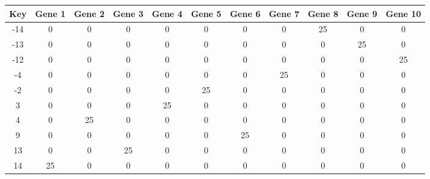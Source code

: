 \begin{tabular}{|c|c|c|c|c|c|c|c|c|c|c|}
\hline
Key & Gene 1 & Gene 2 & Gene 3 & Gene 4 & Gene 5 & Gene 6 & Gene 7 & Gene 8 & Gene 9 & Gene 10 \\
\hline
-14 & 0 & 0 & 0 & 0 & 0 & 0 & 0 & 25 & 0 & 0 \\
-13 & 0 & 0 & 0 & 0 & 0 & 0 & 0 & 0 & 25 & 0 \\
-12 & 0 & 0 & 0 & 0 & 0 & 0 & 0 & 0 & 0 & 25 \\
-4 & 0 & 0 & 0 & 0 & 0 & 0 & 25 & 0 & 0 & 0 \\
-2 & 0 & 0 & 0 & 0 & 25 & 0 & 0 & 0 & 0 & 0 \\
3 & 0 & 0 & 0 & 25 & 0 & 0 & 0 & 0 & 0 & 0 \\
4 & 0 & 25 & 0 & 0 & 0 & 0 & 0 & 0 & 0 & 0 \\
9 & 0 & 0 & 0 & 0 & 0 & 25 & 0 & 0 & 0 & 0 \\
13 & 0 & 0 & 25 & 0 & 0 & 0 & 0 & 0 & 0 & 0 \\
14 & 25 & 0 & 0 & 0 & 0 & 0 & 0 & 0 & 0 & 0 \\
\hline
\end{tabular}